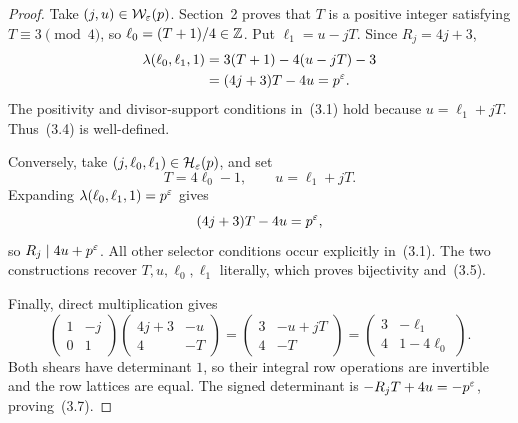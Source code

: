 \begin{proof}
Take \((j,u)\in\mathcal W_\varepsilon(p)\).  Section~2 proves that \(T\) is a
positive integer satisfying \(T\equiv3\pmod4\), so
\(\ell_0=(T+1)/4\in\mathbb Z\).  Put \(\ell_1=u-jT\).  Since
\(R_j=4j+3\),
\begin{align*}
 \lambda(\ell_0,\ell_1,1)
 &=3(T+1)-4(u-jT)-3\\
 &=(4j+3)T-4u=p^\varepsilon.
\end{align*}
The positivity and divisor-support conditions in~(3.1) hold because
\(u=\ell_1+jT\).  Thus~(3.4) is well-defined.

Conversely, take \((j,\ell_0,\ell_1)\in\mathcal H_\varepsilon(p)\), and set
\[
 T=4\ell_0-1,
 \qquad u=\ell_1+jT.
\]
Expanding \(\lambda(\ell_0,\ell_1,1)=p^\varepsilon\) gives
\[
 (4j+3)T-4u=p^\varepsilon,
\]
so \(R_j\mid4u+p^\varepsilon\).  All other selector conditions occur explicitly
in~(3.1).  The two constructions recover \(T,u,\ell_0,\ell_1\) literally,
which proves bijectivity and~(3.5).

Finally, direct multiplication gives
\[
 \begin{pmatrix}1&-j\\0&1\end{pmatrix}
 \begin{pmatrix}4j+3&-u\\4&-T\end{pmatrix}
 =
 \begin{pmatrix}3&-u+jT\\4&-T\end{pmatrix}
 =
 \begin{pmatrix}3&-\ell_1\\4&1-4\ell_0\end{pmatrix}.
\]
Both shears have determinant \(1\), so their integral row operations are
invertible and the row lattices are equal.  The signed determinant is
\(-R_jT+4u=-p^\varepsilon\), proving~(3.7).
\end{proof}

